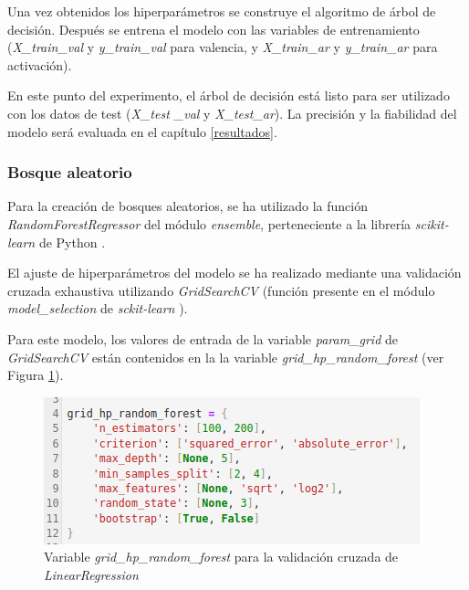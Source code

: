 \documentclass[12pt,a4paper]{article}
\begin{document}
Una vez obtenidos los hiperparámetros se construye el algoritmo de árbol de decisión. Después se entrena el modelo con las variables de entrenamiento (\textit{X\_train\_val} y \textit{y\_train\_val} para valencia, y \textit{X\_train\_ar} y \textit{y\_train\_ar} para activación).


En este punto del experimento, el árbol de decisión está listo para ser utilizado con los datos de test (\textit{X\_test \_val} y \textit{X\_test\_ar}). La precisión y la fiabilidad del modelo será evaluada en el capítulo \ref{resultados}.

\subsubsection{Bosque aleatorio}
Para la creación de bosques aleatorios, se ha utilizado la función \textit{RandomForestRegressor} del módulo \textit{ensemble}, perteneciente a la librería \textit{scikit-learn} de Python \cite{scikit-learn}.


El ajuste de hiperparámetros del modelo se ha realizado mediante una validación cruzada exhaustiva utilizando \textit{GridSearchCV} (función presente en el módulo \textit{model\_selection} de \textit{sckit-learn} \cite{scikit-learn}).

Para este modelo, los valores de entrada de la variable \textit{param\_grid} de \textit{GridSearchCV} están contenidos en la la variable \textit{grid\_hp\_random\_forest} (ver Figura \ref{fig:paramsforest}).
\begin{figure}[H]
	\centering
	\includegraphics[width=0.7\linewidth]{figs/params_forest}
	\caption{Variable \textit{grid\_hp\_random\_forest} para la validación cruzada de \textit{LinearRegression}}
	\label{fig:paramsforest}
\end{figure}
\end{document}
